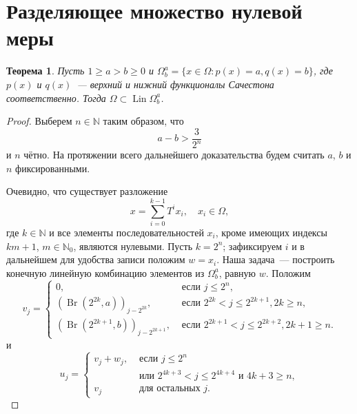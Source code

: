 \documentclass[a4paper,14pt]{article} %
\theoremstyle{plain}
\newtheorem{theorem}[lemma]{Теорема}
\begin{document}
\section{Разделяющее множество нулевой меры}

\begin{theorem}
	\label{thm:Lin_Omega_Sucheston}
	Пусть
	$1 \geq a > b \geq 0$ и
	$\Omega^a_b = \{x\in\Omega : p(x) = a, q(x) = b\}$,
	где $p(x)$ и $q(x)$~--- верхний и нижний функционалы Сачестона~\cite{sucheston1967banach} соответственно.
	Тогда $\Omega \subset \operatorname{Lin} \Omega^a_b$.
\end{theorem}

\begin{proof}
	Выберем $n\in\mathbb{N}$ таким образом, что
	\begin{equation}
		\label{eq:Omega_a_b_gap}
		a - b > \frac{3}{2^n}
	\end{equation}
	и $n$ чётно.
	На протяжении всего дальнейшего доказательства будем считать $a$, $b$ и $n$ фиксированными.

	Очевидно, что существует разложение
	\begin{equation}
		x = \sum_{i=0}^{k-1} T^i x_i, \quad x_i \in \Omega
		,
	\end{equation}
	где $k\in\mathbb{N}$ и все элементы последовательностей $x_i$,
	кроме имеющих индексы $km+1$, $m\in\mathbb{N}_0$, являются нулевыми.
	Пусть $k=2^n$; зафиксируем $i$ и в дальнейшем для удобства записи положим $w=x_i$.
	Наша задача~--- построить конечную линейную комбинацию элементов из $\Omega^a_b$, равную $w$.
	Положим
	\begin{equation}
		v_j = \begin{cases}
			0,  & \mbox{~если~} j \leq 2^n,
			\\
			(\operatorname{Br}(2^{2k  },a))_{j-2^{2k  }},  & \mbox{~если~} 2^{2k  } < j \leq 2^{2k+1}, 2k   \geq n,
			\\
			(\operatorname{Br}(2^{2k+1},b))_{j-2^{2k+1}},  & \mbox{~если~} 2^{2k+1} < j \leq 2^{2k+2}, 2k+1 \geq n
			.
		\end{cases}
	\end{equation}
	и
	\begin{equation}
		u_j = \begin{cases}
			v_j + w_j,  & \mbox{~если~} j \leq 2^n
			\\
			            & \mbox{~или~} 2^{4k+3} < j \leq 2^{4k+4} \mbox{~и~} 4k + 3 \geq n,
			\\
			v_j         & \mbox{~для остальных~} j
			.
		\end{cases}
	\end{equation}


\end{proof}
\end{document}
